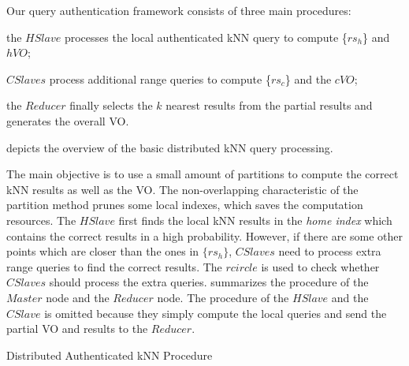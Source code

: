 Our query authentication framework consists of three main procedures:
\begin{inlineenum}
\item the $HSlave$ processes the local authenticated kNN query to compute \{$rs_{h}$\} and $hVO$;
\item $CSlaves$ process additional range queries to compute \{$rs_{c}$\} and the $cVO$;
\item the $Reducer$ finally selects the $k$ nearest results from the partial results and generates the overall VO\@.
\end{inlineenum}
 depicts the overview of the basic distributed kNN query processing.

The main objective is to use a small amount of partitions to compute the correct kNN results as well as the VO\@. The non-overlapping characteristic of the partition method prunes some local indexes, which saves the computation resources. The $HSlave$ first finds the local kNN results in the \emph{home index} which contains the correct results in a high probability. However, if there are some other points which are closer than the ones in $\{rs_{h}\}$, $CSlaves$ need to process extra range queries to find the correct results. The $rcircle$ is used  to check whether $CSlaves$ should process the extra queries.  summarizes the procedure of the $Master$ node and the $Reducer$ node. The procedure of the $HSlave$ and the $CSlave$ is omitted because they simply compute the local queries and send the partial VO and results to the $Reducer$.

\begin{algorithm}[htbp]
  \caption{Distributed Authenticated kNN Procedure}\label{alg:knn:master}
\end{algorithm}

